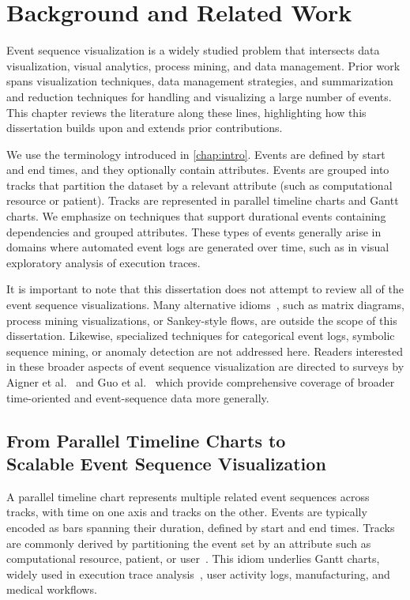

\chapter{Background and Related Work}
\label{chap:background}

\begin{refsection}
Event sequence visualization is a widely studied problem that intersects data visualization, visual analytics, process mining, and data management. Prior work spans visualization techniques, data management strategies, and summarization and reduction techniques for handling and visualizing a large number of events. This chapter reviews the literature along these lines, highlighting how this dissertation builds upon and extends prior contributions.

We use the terminology introduced in \autoref{chap:intro}. Events are defined by start and end times, and they optionally contain attributes. Events are grouped into tracks that partition the dataset by a relevant attribute (such as computational resource or patient). Tracks are represented in parallel timeline charts and Gantt charts. We emphasize on techniques that support durational events containing dependencies and grouped attributes. These types of events generally arise in domains where automated event logs are generated over time, such as in visual exploratory analysis of execution traces.

It is important to note that this dissertation does not attempt to review all of the event sequence visualizations. Many alternative idioms~\cite{yeshchenko2024survey}, such as matrix diagrams, process mining visualizations, or Sankey-style flows, are outside the scope of this dissertation. Likewise, specialized techniques for categorical event logs, symbolic sequence mining, or anomaly detection are not addressed here. Readers interested in these broader aspects of event sequence visualization are directed to surveys by Aigner et al.~\cite{aigner2023visualization} and Guo et al.~\cite{guo2021survey} which provide comprehensive coverage of broader time-oriented and event-sequence data more generally.

\section[From Parallel Timeline Charts to Scalable Event Sequence Visualization]{From Parallel Timeline Charts to \\ Scalable Event Sequence Visualization}
A parallel timeline chart represents multiple related event sequences across tracks, with time on one axis and tracks on the other. Events are typically encoded as bars spanning their duration, defined by start and end times. Tracks are commonly derived by partitioning the event set by an attribute such as computational resource, patient, or user~\cite{wilson2003gantt,jo2014livegantt,antweiler2022uncovering}. This idiom underlies Gantt charts, widely used in execution trace analysis~\cite{isaacs2014state,ezzati2017multi}, user activity logs, manufacturing, and medical workflows.


\end{refsection}
